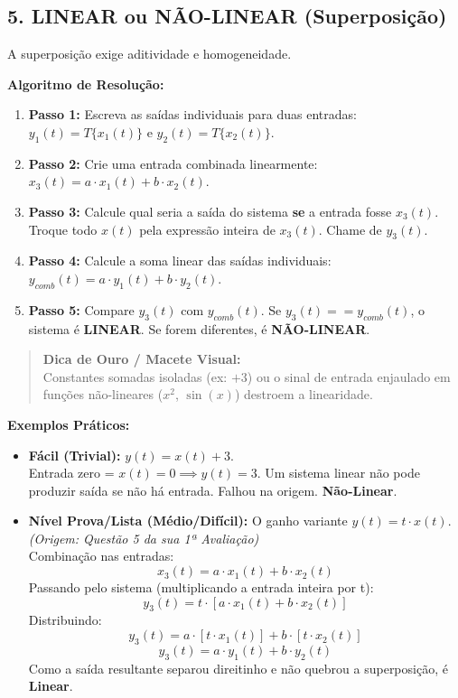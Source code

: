 \subsection{5. LINEAR ou NÃO-LINEAR (Superposição)}\label{linear-ou-nuxe3o-linear-superposiuxe7uxe3o}

A superposição exige aditividade e homogeneidade.

\textbf{Algoritmo de Resolução:}

\begin{enumerate}
\def\labelenumi{\arabic{enumi}.}
\tightlist
\item
  \textbf{Passo 1:} Escreva as saídas individuais para duas entradas: \(y_1(t) = T\{x_1(t)\}\) e \(y_2(t) = T\{x_2(t)\}\).
\item
  \textbf{Passo 2:} Crie uma entrada combinada linearmente: \(x_3(t) = a \cdot x_1(t) + b \cdot x_2(t)\).
\item
  \textbf{Passo 3:} Calcule qual seria a saída do sistema \textbf{se} a entrada fosse \(x_3(t)\). Troque todo \(x(t)\) pela expressão inteira de \(x_3(t)\). Chame de \(y_3(t)\).
\item
  \textbf{Passo 4:} Calcule a soma linear das saídas individuais: \(y_{comb}(t) = a \cdot y_1(t) + b \cdot y_2(t)\).
\item
  \textbf{Passo 5:} Compare \(y_3(t)\) com \(y_{comb}(t)\). Se \(y_3(t) == y_{comb}(t)\), o sistema é \textbf{LINEAR}. Se forem diferentes, é \textbf{NÃO-LINEAR}.
\end{enumerate}

\begin{quote}
\textbf{Dica de Ouro / Macete Visual:}\\
Constantes somadas isoladas (ex: \(+3\)) ou o sinal de entrada enjaulado em funções não-lineares (\(x^2\), \(\sin(x)\)) destroem a linearidade.
\end{quote}

\textbf{Exemplos Práticos:}

\begin{itemize}
\item
  \textbf{Fácil (Trivial):} \(y(t) = x(t) + 3\).\\
  Entrada zero = \(x(t) = 0 \implies y(t) = 3\). Um sistema linear não pode produzir saída se não há entrada. Falhou na origem. \textbf{Não-Linear}.
\item
  \textbf{Nível Prova/Lista (Médio/Difícil):} O ganho variante \(y(t) = t \cdot x(t)\).\\
  \emph{(Origem: Questão 5 da sua 1ª Avaliação)}\\
  Combinação nas entradas:
  \[x_3(t) = a \cdot x_1(t) + b \cdot x_2(t)\]
  Passando pelo sistema (multiplicando a entrada inteira por t):
  \[y_3(t) = t \cdot [a \cdot x_1(t) + b \cdot x_2(t)]\]
  Distribuindo:
  \[y_3(t) = a \cdot [t \cdot x_1(t)] + b \cdot [t \cdot x_2(t)]\]
  \[y_3(t) = a \cdot y_1(t) + b \cdot y_2(t)\]
  Como a saída resultante separou direitinho e não quebrou a superposição, é \textbf{Linear}.
\end{itemize}

